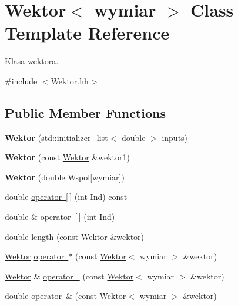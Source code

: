 \hypertarget{class_wektor}{}\section{Wektor$<$ wymiar $>$ Class Template Reference}
\label{class_wektor}


Klasa wektora.  




{\ttfamily \#include $<$Wektor.\+hh$>$}

\subsection*{Public Member Functions}
\begin{DoxyCompactItemize}
\item 
\mbox{\label{class_wektor_afb0e52aea043f934d7edb02f6db26b39}} 
{\bfseries Wektor} (std\+::initializer\+\_\+list$<$ double $>$ inputs)
\item 
\mbox{\label{class_wektor_ad6b3afbe95e12c1c9f839b254ba85246}} 
{\bfseries Wektor} (const \mbox{\hyperlink{class_wektor}{Wektor}} \&wektor1)
\item 
\mbox{\label{class_wektor_a09e64e36a1443687efe6c8ca2487bd47}} 
{\bfseries Wektor} (double Wspol\mbox{[}wymiar\mbox{]})
\item 
double \mbox{\hyperlink{class_wektor_aa7da735aa63205e853363b32dae520d7}{operator \mbox{[}$\,$\mbox{]}}} (int Ind) const
\item 
double \& \mbox{\hyperlink{class_wektor_aa37426fea8cdf38b5e38666ae10e6f76}{operator \mbox{[}$\,$\mbox{]}}} (int Ind)
\item 
double \mbox{\hyperlink{class_wektor_af1ce23d4a271c8d4c31efd2dab493169}{length}} (const \mbox{\hyperlink{class_wektor}{Wektor}} \&wektor)
\item 
\mbox{\hyperlink{class_wektor}{Wektor}} \mbox{\hyperlink{class_wektor_a82858892953cabc911195dd99bd06950}{operator $\ast$}} (const \mbox{\hyperlink{class_wektor}{Wektor}}$<$ wymiar $>$ \&wektor)
\item 
\mbox{\hyperlink{class_wektor}{Wektor}} \& \mbox{\hyperlink{class_wektor_acb74d69394c482fbcda11f58f1327a39}{operator=}} (const \mbox{\hyperlink{class_wektor}{Wektor}}$<$ wymiar $>$ \&wektor)
\item 
double \mbox{\hyperlink{class_wektor_a8050f7363a974eb96839b05c0613a97b}{operator \&}} (const \mbox{\hyperlink{class_wektor}{Wektor}}$<$ wymiar $>$ \&wektor)

\end{DoxyCompactItemize}
